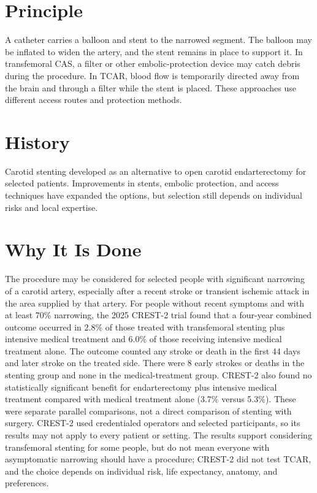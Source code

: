\section*{Principle}
A catheter carries a balloon and stent to the narrowed segment. The balloon may be inflated to widen the artery, and the stent remains in place to support it. In transfemoral CAS, a filter or other embolic-protection device may catch debris during the procedure. In TCAR, blood flow is temporarily directed away from the brain and through a filter while the stent is placed. These approaches use different access routes and protection methods.

\section*{History}
Carotid stenting developed as an alternative to open carotid endarterectomy for selected patients. Improvements in stents, embolic protection, and access techniques have expanded the options, but selection still depends on individual risks and local expertise.

\section*{Why It Is Done}
The procedure may be considered for selected people with significant narrowing of a carotid artery, especially after a recent stroke or transient ischemic attack in the area supplied by that artery. For people without recent symptoms and with at least 70\% narrowing, the 2025 CREST-2 trial found that a four-year combined outcome occurred in 2.8\% of those treated with transfemoral stenting plus intensive medical treatment and 6.0\% of those receiving intensive medical treatment alone. The outcome counted any stroke or death in the first 44 days and later stroke on the treated side. There were 8 early strokes or deaths in the stenting group and none in the medical-treatment group. CREST-2 also found no statistically significant benefit for endarterectomy plus intensive medical treatment compared with medical treatment alone (3.7\% versus 5.3\%). These were separate parallel comparisons, not a direct comparison of stenting with surgery. CREST-2 used credentialed operators and selected participants, so its results may not apply to every patient or setting. The results support considering transfemoral stenting for some people, but do not mean everyone with asymptomatic narrowing should have a procedure; CREST-2 did not test TCAR, and the choice depends on individual risk, life expectancy, anatomy, and preferences.

